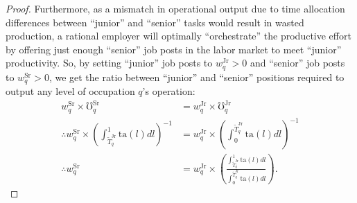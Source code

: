 \documentclass[hidelinks, nonatbib]{elsarticle}
\begin{document}
\begin{theorem}
\begin{proof}
        Furthermore, as a mismatch in operational output due to time allocation differences between ``junior'' and ``senior'' tasks would result in wasted production, a rational employer will optimally ``orchestrate'' the productive effort by offering just enough ``senior'' job posts in the labor market to meet ``junior'' productivity. So, by setting ``junior'' job posts to $w_{q}^{\text{Jr}} > 0$ and ``senior'' job posts to $w_{q}^{\text{Sr}} > 0$, we get the ratio between ``junior'' and ``senior'' positions required to output any level of occupation $q$'s operation:
        \begin{align}
            w_{q}^{\text{Sr}} 
            \times 
            \mho_{q}^{\text{Sr}} 
            &= 
            w_{q}^{\text{Jr}} 
            \times 
            \mho_{q}^{\text{Jr}}
            \\
            \therefore
            w_{q}^{\text{Sr}}
            \times 
            \left(
                \int_{\tilde{T}_{q}^{\text{Jr}}}^{1}
                    \text{ta}(l)
                    dl
            \right) ^ {-1}
            &= 
            w_{q}^{\text{Jr}}
            \times 
            \left(
                \int_{0}^{\tilde{T}_{q}^{\text{Jr}}}
                    \text{ta}(l)
                    dl
            \right) ^ {-1}
            \\
            \therefore
            w_{q}^{\text{Sr}}
            &= 
            w_{q}^{\text{Jr}}
            \times
            \left(
                \frac{
                    \int_{\tilde{T}_{q}^{\text{Jr}}}^{1}
                        \text{ta}(l)
                        dl
                }{
                    \int_{0}^{\tilde{T}_{q}^{\text{Jr}}}
                        \text{ta}(l)
                        dl
                }
            \right)
            .
        \end{align}
        

\end{proof}
\end{theorem}
\end{document}
